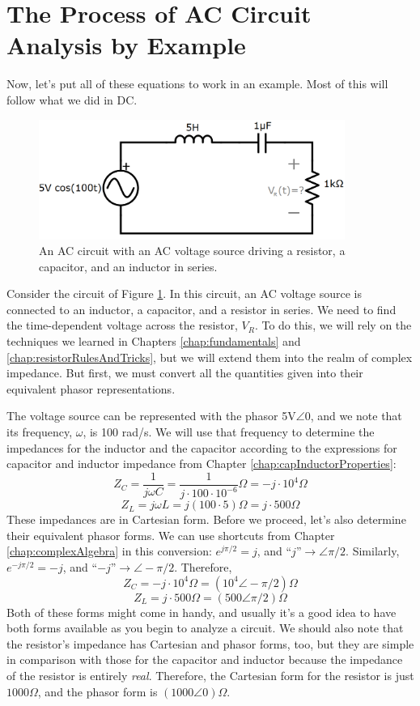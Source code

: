 \section{The Process of AC Circuit Analysis by Example}
Now, let's put all of these equations to work in an example. Most of this will follow what we did in DC.
\begin{figure}[h!]
\centering
\includegraphics[width=10cm]{figures/firstACcircuit.png}
\caption{An AC circuit with an AC voltage source driving a resistor, a capacitor, and an inductor in series.}
\label{myFirstACCircuit}
\end{figure}
\par
Consider the circuit of Figure \ref{myFirstACCircuit}. In this circuit, an AC voltage source is connected to an inductor, a capacitor, and a resistor in series. We need to find the time-dependent voltage across the resistor, $V_R$. To do this, we will rely on the techniques we learned in Chapters \ref{chap:fundamentals} and \ref{chap:resistorRulesAndTricks}, but we will extend them into the realm of complex impedance. But first, we must convert all the quantities given into their equivalent phasor representations.
\par
The voltage source can be represented with the phasor 5V$\angle$0, and we note that its frequency, $\omega$, is 100 rad/s. We will use that frequency to determine the impedances for the inductor and the capacitor according to the expressions for capacitor and inductor impedance from Chapter \ref{chap:capInductorProperties}:
$$
Z_C = \frac{1}{j\omega C} = \frac{1}{j\cdot100\cdot10^{-6}} \Omega= -j\cdot10^{4}\Omega
$$
$$
Z_L = j\omega L = j(100\cdot5) \Omega = j\cdot500\Omega
$$
These impedances are in Cartesian form. Before we proceed, let's also determine their equivalent phasor forms. We can use shortcuts from Chapter \ref{chap:complexAlgebra} in this conversion: $e^{j\pi/2}=j$, and ``$j$''$\rightarrow\angle\pi/2$. Similarly, $e^{-j\pi/2}=-j$, and ``$-j$''$\rightarrow\angle-\pi/2$. Therefore, 
$$
Z_C = -j\cdot10^{4}\Omega = (10^4\angle-\pi/2)\Omega
$$
$$
Z_L = j\cdot500\Omega = (500\angle\pi/2)\Omega
$$
Both of these forms might come in handy, and usually it's a good idea to have both forms available as you begin to analyze a circuit. We should also note that the resistor's impedance has Cartesian and phasor forms, too, but they are simple in comparison with those for the capacitor and inductor because the impedance of the resistor is entirely \textit{real}. Therefore, the Cartesian form for the resistor is just $1000\Omega$, and the phasor form is $(1000\angle0)\Omega$.
